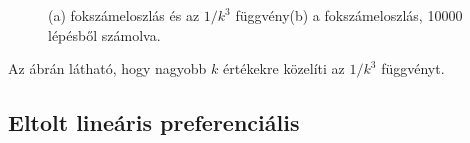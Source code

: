 \documentclass[12pt]{article}
\begin{document}
 \begin{figure}[H]
\centering     
{}

\caption{(a) fokszámeloszlás és az $1/k^3$ függvény(b) a fokszámeloszlás, 10000 lépésből számolva.}
\label{fig: k}
\end{figure}
Az ábrán látható, hogy nagyobb $k$ értékekre közelíti az $1/k^3$ függvényt.


\subsection*{Eltolt lineáris preferenciális}
\end{document}
